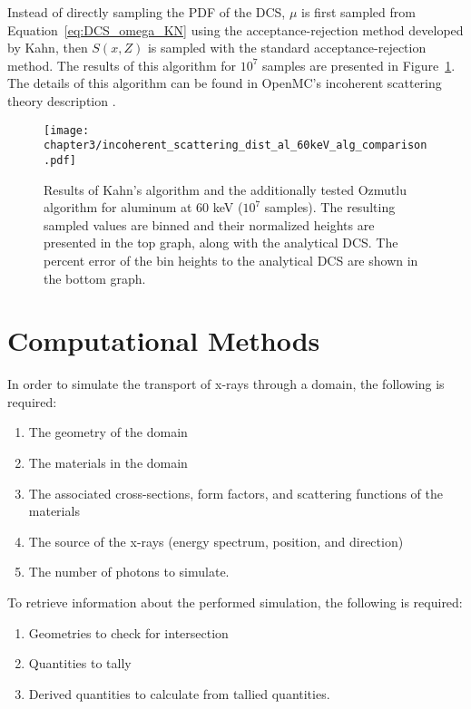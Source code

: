 \par Instead of directly sampling the PDF of the DCS, $\mu$ is first sampled from Equation~\ref{eq:DCS_omega_KN} using the acceptance-rejection method developed by Kahn, then $S(x, Z)$ is sampled with the standard acceptance-rejection method. The results of this algorithm for $10^7$ samples are presented in Figure~\ref{fig:kahn}. The details of this algorithm can be found in OpenMC's incoherent scattering theory description \cite{lund2018implementation}.


\begin{figure}[H]
    \centering
    \texttt{[image: chapter3/incoherent\_scattering\_dist\_al\_60keV\_alg\_comparison.pdf]}
    \caption{Results of Kahn's algorithm and the additionally tested Ozmutlu algorithm \cite{ozmutlu1992sampling} for aluminum at 60 keV ($10^7$ samples). The resulting sampled values are binned and their normalized heights are presented in the top graph, along with the analytical DCS. The percent error of the bin heights to the analytical DCS are shown in the bottom graph.}
    \label{fig:kahn}
\end{figure}


\section{Computational Methods}

In order to simulate the transport of x-rays through a domain, the following is required:

\begin{enumerate}
    \item The geometry of the domain
    \item The materials in the domain
    \item The associated cross-sections, form factors, and scattering functions of the materials
    \item The source of the x-rays (energy spectrum, position, and direction)
    \item The number of photons to simulate.
\end{enumerate}

To retrieve information about the performed simulation, the following is required:

\begin{enumerate}
    \item Geometries to check for intersection
    \item Quantities to tally
    \item Derived quantities to calculate from tallied quantities.
\end{enumerate}

